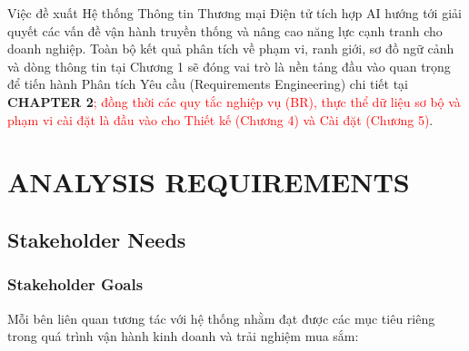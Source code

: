 \documentclass[12pt,a4paper,oneside]{report}
\newif\ifmark \marktrue
\newcommand{\chg}[1]{\ifmark\textcolor{red}{#1}\else #1\fi}
\begin{document}
Việc đề xuất Hệ thống Thông tin Thương mại Điện tử tích hợp AI hướng tới giải quyết các vấn đề vận hành truyền thống và nâng cao năng lực cạnh tranh cho doanh nghiệp. Toàn bộ kết quả phân tích về phạm vi, ranh giới, sơ đồ ngữ cảnh và dòng thông tin tại Chương 1 sẽ đóng vai trò là nền tảng đầu vào quan trọng để tiến hành Phân tích Yêu cầu (Requirements Engineering) chi tiết tại \textbf{CHAPTER 2}\chg{; đồng thời các quy tắc nghiệp vụ (BR), thực thể dữ liệu sơ bộ và phạm vi cài đặt là đầu vào cho Thiết kế (Chương 4) và Cài đặt (Chương 5)}.

\chapter{ANALYSIS REQUIREMENTS}

\section{Stakeholder Needs}

\subsection{Stakeholder Goals}

Mỗi bên liên quan tương tác với hệ thống nhằm đạt được các mục tiêu riêng trong quá trình vận hành kinh doanh và trải nghiệm mua sắm:
\end{document}
